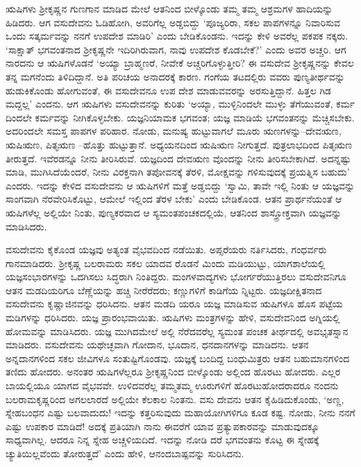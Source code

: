ಋಷಿಗಳು ಶ್ರೀಕೃಷ್ಣನ ಗುಣಗಾನ ಮಾಡಿದ ಮೇಲೆ ಆತನಿಂದ ಬೀಳ್ಕೊಂಡು ತಮ್ಮ ತಮ್ಮ ಆಶ್ರಮಗಳ ಹಾದಿಯನ್ನು ಹಿಡಿದರು. ಆಗ ವಸುದೇವನು ಓಡಿಹೋಗಿ, ಅವರಿಗೆಲ್ಲ ಅಡ್ಡಬಿದ್ದು ‘ಪೂಜ್ಯರಿರಾ, ಸಕಲ ಪಾಪಗಳನ್ನೂ ನಿವಾರಿಸುವ ಒಂದು ಸತ್ಕರ್ಮವನ್ನು ನನಗೆ ಉಪದೇಶ ಮಾಡಿರಿ’ ಎಂದು ಬೇಡಿಕೊಂಡನು. ಇದನ್ನು ಕೇಳಿ ಅವರೆಲ್ಲ ಪಕಪಕ ನಕ್ಕರು. ‘ಸಾಕ್ಷಾತ್ ಭಗವಂತನಾದ ಶ್ರೀಕೃಷ್ಣನೇ ಇದಿರಿಗಿರುವಾಗ, ನಾವು ಉಪದೇಶ ಕೊಡಬೇಕೆ?’ ಎಂದು ಅವರ ಅಚ್ಚರಿ. ಆಗ ನಾರದನು ಆ ಋಷಿಗಳೊಡನೆ ‘ಅಯ್ಯಾ ಬ್ರಾಹ್ಮಣರೆ, ನೀವೇಕೆ ಅಚ್ಚರಿಗೊಳ್ಳುತ್ತೀರಿ? ಈ ವಸುದೇವ ಶ್ರೀಕೃಷ್ಣನನ್ನು ಕೇವಲ ತನ್ನ ಮಗನೆಂದು ತಿಳಿದಿದ್ದಾನೆ. ಅತಿ ಪರಿಚಯ ಅನಾದರಕ್ಕೆ ಕಾರಣ. ಗಂಗೆಯ ತಟದಲ್ಲಿರು ವವರು ಪುಣ್ಯತೀರ್ಥವನ್ನು ಹುಡುಕಿಕೊಂಡು ಹೋಗುವಂತೆ, ಈ ವಸುದೇವನೂ ಉಪ ದೇಶ ಮಾಡುವವರನ್ನು ಅರಸುತ್ತಿದ್ದಾನೆ. ಹಿತ್ತಲ ಗಿಡ ಮದ್ದಲ್ಲ’ ಎಂದನು. ಆಗ ಋಷಿಗಳು ವಸುದೇವನನ್ನು ಕುರಿತು ‘ಅಯ್ಯಾ, ಮುಳ್ಳಿನಿಂದಲೇ ಮುಳ್ಳು ತೆಗೆಯುವಂತೆ, ಕರ್ಮ ದಿಂದಲೇ ಕರ್ಮವನ್ನು ನೀಗಿಕೊಳ್ಳಬೇಕು. ಯಜ್ಞನಿಯಾಮಕ ಭಗವಂತ; ಯಜ್ಞ ಮಾಡಿಯೆ ಭಗವಂತನನ್ನು ಮೆಚ್ಚಿಸಬೇಕು. ಅದರಿಂದಲೇ ಸಮಸ್ತ ಪಾಪಗಳ ಪರಿಹಾರ. ನೋಡು, ಮನುಷ್ಯ ಹುಟ್ಟುವಾಗಲೆ ಮೂರು ಋಣಗಳನ್ನು–ದೇವಋಣ, ಋಷಿಋಣ, ಪಿತೃಋಣ –ಹೊತ್ತು ಹುಟ್ಟುತ್ತಾನೆ. ಅಧ್ಯಯನದಿಂದ ಋಷಿಋಣ ನೀಗುತ್ತದೆ. ಪುತ್ರಲಾಭದಿಂದ ಪಿತೃಋಣ ತೀರುತ್ತದೆ. ಇವೆರಡನ್ನೂ ನೀನು ತೀರಿಸಿರುವೆ. ಯಜ್ಞದಿಂದ ದೇವಋಣ ವೊಂದನ್ನು ನೀನು ತೀರಿಸಬೇಕಾಗಿದೆ. ಅದನ್ನಷ್ಟು ಮಾಡಿ, ಮುಗಿಸಿದೆಯೆಂದರೆ, ನೀನು ವಿರಕ್ತನಾಗಿ ತಪೋವನಕ್ಕೆ ತೆರಳಿ, ಮೋಕ್ಷವನ್ನು ಗಳಿಸುವುದಕ್ಕೆ ಪ್ರಯತ್ನಿಸ ಬಹುದು’ ಎಂದರು. ಇದನ್ನು ಕೇಳಿದ ವಸುದೇವನು ಆ ಋಷಿಗಳಿಗೆ ಮತ್ತೆ ಅಡ್ಡಬಿದ್ದು ‘ಸ್ವಾಮಿ, ತಾವೇ ಇಲ್ಲಿ ನಿಂತು ಆ ಯಜ್ಞವನ್ನು ಸಾಂಗವಾಗಿ ನೆರವೇರಿಸಿಕೊಟ್ಟು, ಆಮೇಲೆ ಇಲ್ಲಿಂದ ತೆರಳ ಬೇಕು’ ಎಂದು ಬೇಡಿಕೊಂಡ. ಆತನ ಪ್ರಾರ್ಥನೆಯಂತೆ ಆ ಋಷಿಗಳೆಲ್ಲ ಅಲ್ಲಿಯೇ ನಿಂತು, ಪುಣ್ಯಕರವಾದ ಆ ಸ್ಯಮಂತಪಂಚಕದಲ್ಲಿಯೆ, ಆತನಿಂದ ಶಾಸ್ತ್ರೋಕ್ತವಾಗಿ ಯಜ್ಞವನ್ನು ಮಾಡಿಸಿದರು.

ವಸುದೇವನು ಕೈಕೊಂಡ ಯಜ್ಞವು ಅತ್ಯಂತ ವೈಭವದಿಂದ ನಡೆಯಿತು. ಅಪ್ಸರೆಯರು ನರ್ತಿಸಿದರು, ಗಂಧರ್ವರು ಗಾನಮಾಡಿದರು. ಶ್ರೀಕೃಷ್ಣ ಬಲರಾಮರು ಸಕಲ ಯಾದವ ರೊಡನೆ ಮಿಂದು ಮಡಿಯುಟ್ಟು, ಯಾಗಶಾಲೆಯಲ್ಲಿ ಯಜ್ಞಸಂಭಾರಗಳನ್ನು ಒದಗಿಸಲು ಸಿದ್ಧರಾಗಿ ನಿಂತಿದ್ದರು. ಮಂಗಳವಾದ್ಯಗಳು ಭೋರ್ಗರೆಯುತ್ತಿರಲು ವಸುದೇವನಿಗೂ ಆತನ ಮಡದಿಯರಿಗೂ ಬೆಣ್ಣೆಯನ್ನು ಹಚ್ಚಿ ನೀರೆರೆದರು; ಕಣ್ಣುಗಳಿಗೆ ಕಾಡಿಗೆಯ ನ್ನಿಟ್ಟರು. ಯಜ್ಞದೀಕ್ಷಿತನಾದ ವಸುದೇವನು ಕೃಷ್ಣಾಜಿನವನ್ನು ಧರಿಸಿದನು. ಆತನ ಮಡದಿ ಯರೂ ಯಜ್ಞ ಮಾಡಿಸುವ ಋಷಿಗಳೂ ಹೊಸ ಪಟ್ಟೆಯ ಮಡಿಗಳನ್ನು ಧರಿಸಿದರು. ಯಜ್ಞ ಪ್ರಾರಂಭವಾಯಿತು. ಋಷಿಗಳು ಮಂತ್ರಗಳನ್ನು ಹೇಳಿ, ವಸುದೇವನಿಂದ ಅಗ್ನಿಯಲ್ಲಿ ಹೋಮವನ್ನು ಮಾಡಿಸಿದರು. ಯಜ್ಞ ಮುಗಿದಮೇಲೆ ಅಲ್ಲಿ ನೆರೆದವರೆಲ್ಲ ಸ್ಯಮಂತ ಪಂಚಕ ತೀರ್ಥದಲ್ಲಿ ಅವಭೃತಸ್ನಾನ ಮಾಡಿದರು. ವಸುದೇವನು ಯಥೇಚ್ಛವಾಗಿ ಗೋದಾನ, ಭೂದಾನ, ಧನದಾನಗಳನ್ನು ಮಾಡಿದನು. ಆತನ ಅನ್ನದಾನಗಳಿಂದ ಸಕಲ ಜೀವಿಗಳೂ ಸಂತುಷ್ಟಿಗೊಂಡವು. ಯಜ್ಞಕ್ಕೆ ಬಂದಿದ್ದ ಬಂಧುಮಿತ್ರರು ಆತನ ಬಹುಮಾನಗಳಿಂದ ತಣಿದು ಹೋದರು. ಅನಂತರ ಋಷಿಗಳೆಲ್ಲರೂ ಶ್ರೀಕೃಷ್ಣನಿಂದ ಬೀಳ್ಕೊಂಡು ಅಲ್ಲಿಂದ ಹೊರಟು ಹೋದರು. ಎಲ್ಲರ ಬಾಯಲ್ಲಿಯೂ ಯಾಗದ ವೈಭವವೇ. ಉಳಿದವರೆಲ್ಲ ತಮ್ಮತಮ್ಮ ಊರುಗಳಿಗೆ ಹೊರಟುಹೋದರಾದರೂ ನಂದನು ಬಲರಾಮಕೃಷ್ಣರಿಂದ ಅಗಲಲಾರದೆ ಅಲ್ಲಿಯೇ ಕೆಲಕಾಲ ನಿಂತನು. ವಸು ದೇವನು ಆತನ ಕೈಹಿಡಿದುಕೊಂಡು, ‘ಅಣ್ಣ, ಸ್ನೇಹಬಂಧನ ಎಷ್ಟು ಬಲವಾದುದು! ಇದನ್ನು ಕತ್ತರಿಸುವುದು ಮಹಾಯೋಗಿಗಳಿಗೂ ಕೂಡ ಕಷ್ಟ. ನೋಡು, ನೀನು ನನಗೆ ಎಷ್ಟು ಉಪಕಾರ ಮಾಡಿದೆ! ಅದಕ್ಕೆ ಪ್ರತಿಯಾಗಿ ನಾನು ಈವರೆಗೆ ಯಾವ ಪ್ರತ್ಯುಪಕಾರವನ್ನು ಮಾಡುವುದಕ್ಕೂ ಸಾಧ್ಯವಾಗಿಲ್ಲ. ಆದರೂ ನಿನ್ನ ಸ್ನೇಹ ಅಚ್ಚಳಿಯದಿದೆ. ಇದನ್ನು ನೋಡಿ ದರೆ ಭಗವಂತನು ಕೊಟ್ಟ ಈ ಸ್ನೇಹಕ್ಕೆ ಚ್ಯುತಿಯಿಲ್ಲವೆಂದು ತೋರುತ್ತದೆ’ ಎಂದು ಹೇಳಿ, ಆನಂದಬಾಷ್ಪವನ್ನು ಸುರಿಸಿದನು.

